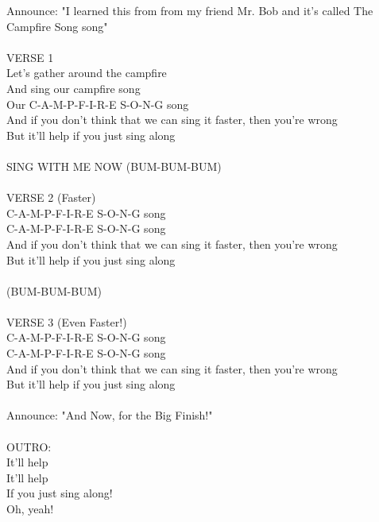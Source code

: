 
Announce: "I learned this from from my friend Mr. Bob and it's called The Campfire Song song"\\
\\
VERSE 1\\
Let's gather around the campfire\\
And sing our campfire song\\
Our C-A-M-P-F-I-R-E S-O-N-G song\\
And if you don't think that we can sing it faster, then you're wrong\\
But it'll help if you just sing along\\
\\
SING WITH ME NOW (BUM-BUM-BUM)\\
\\
VERSE 2 (Faster)\\
C-A-M-P-F-I-R-E S-O-N-G song\\
C-A-M-P-F-I-R-E S-O-N-G song\\
And if you don't think that we can sing it faster, then you're wrong\\
But it'll help if you just sing along\\
\\
(BUM-BUM-BUM)\\
\\
VERSE 3 (Even Faster!)\\
C-A-M-P-F-I-R-E S-O-N-G song\\
C-A-M-P-F-I-R-E S-O-N-G song\\
And if you don't think that we can sing it faster, then you're wrong\\
But it'll help if you just sing along\\
\\
Announce: "And Now, for the Big Finish!"\\
\\
OUTRO:\\
It'll help\\
It'll help\\
If you just sing along!\\
Oh, yeah!\\
